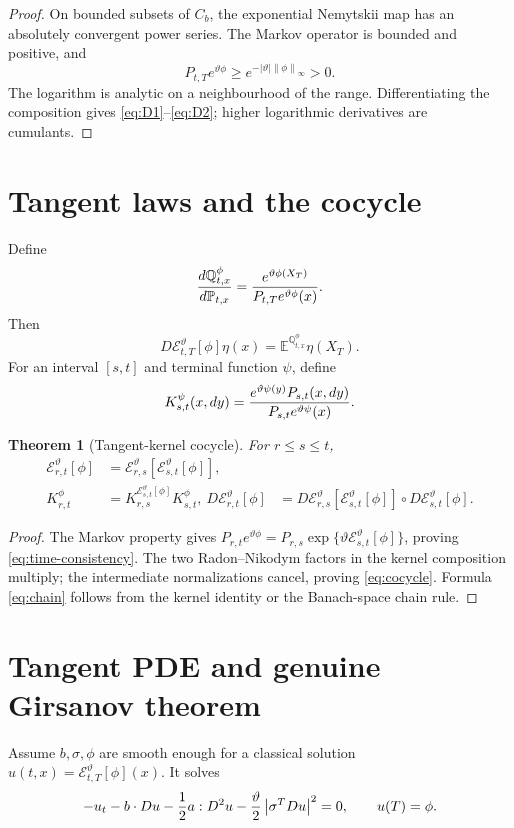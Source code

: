 \documentclass[11pt,reqno]{amsart}
\newtheorem{theorem}{Theorem}[section]
\theoremstyle{definition}
\theoremstyle{remark}
\newcommand{\E}{\mathbb E}
\newcommand{\Pp}{\mathbb P}
\newcommand{\Qp}{\mathbb Q}
\newcommand{\cE}{\mathcal E}
\newcommand{\norm}[1]{\left\lVert #1\right\rVert}
\newcommand{\abs}[1]{\left\lvert #1\right\rvert}
\begin{document}
\begin{proof}
On bounded subsets of $C_b$, the exponential Nemytskii map has an absolutely
convergent power series.  The Markov operator is bounded and positive, and
\[
 P_{t,T}e^{\vartheta\phi}
 \ge e^{-\abs\vartheta\norm\phi_\infty}>0.
\]
The logarithm is analytic on a neighbourhood of the range.  Differentiating
the composition gives \eqref{eq:D1}--\eqref{eq:D2}; higher logarithmic
derivatives are cumulants.
\end{proof}

\section{Tangent laws and the cocycle}\label{sec:cocycle}
Define
\begin{equation}\label{eq:terminal-tilt}
 {d\Qp_{t,x}^{\phi}\over d\Pp_{t,x}}
 ={e^{\vartheta\phi(X_T)}
  \over P_{t,T}e^{\vartheta\phi}(x)}.
\end{equation}
Then
\[
 D\cE_{t,T}^{\vartheta}[\phi]\eta(x)
 =\E^{\Qp_{t,x}^{\phi}}\eta(X_T).
\]
For an interval $[s,t]$ and terminal function $\psi$, define
\[
 K_{s,t}^{\psi}(x,dy)=
 {e^{\vartheta\psi(y)}P_{s,t}(x,dy)
  \over P_{s,t}e^{\vartheta\psi}(x)}.
\]

\begin{theorem}[Tangent-kernel cocycle]\label{thm:cocycle}
For $r\le s\le t$,
\begin{align}
 \cE_{r,t}^{\vartheta}[\phi]
 &=\cE_{r,s}^{\vartheta}
   [\cE_{s,t}^{\vartheta}[\phi]],\label{eq:time-consistency}\\
 K_{r,t}^{\phi}
 &=K_{r,s}^{\cE_{s,t}^{\vartheta}[\phi]}
   K_{s,t}^{\phi},
 \label{eq:cocycle}\
 D\cE_{r,t}^{\vartheta}[\phi]
 &=D\cE_{r,s}^{\vartheta}
   [\cE_{s,t}^{\vartheta}[\phi]]
   \circ D\cE_{s,t}^{\vartheta}[\phi].
 \label{eq:chain}
\end{align}
\end{theorem}

\begin{proof}
The Markov property gives
$P_{r,t}e^{\vartheta\phi}
=P_{r,s}\exp\{\vartheta\cE_{s,t}^{\vartheta}[\phi]\}$, proving
\eqref{eq:time-consistency}.  The two Radon--Nikodym factors in the kernel
composition multiply; the intermediate normalizations cancel, proving
\eqref{eq:cocycle}.  Formula \eqref{eq:chain} follows from the kernel identity
or the Banach-space chain rule.
\end{proof}

\section{Tangent PDE and genuine Girsanov theorem}\label{sec:Girsanov}
Assume $b,\sigma,\phi$ are smooth enough for a classical solution
$u(t,x)=\cE_{t,T}^{\vartheta}[\phi](x)$.  It solves
\begin{equation}\label{eq:entropicPDE}
 -u_t-b\cdot Du-{1\over2}a:D^2u
 -{\vartheta\over2}\abs{\sigma^TDu}^2=0,
 \qquad u(T)=\phi.
\end{equation}
\end{document}
